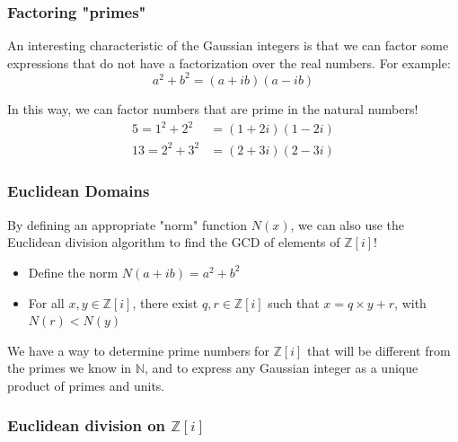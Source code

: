 \documentclass{beamer}
\begin{document}
\begin{frame}
	\frametitle{Factoring "primes"}

	An interesting characteristic of the Gaussian integers is that we can factor some
	expressions that do not have a factorization over the real numbers. For example:
	\[a^2 + b^2 = (a+ib)(a-ib) \]

	In this way, we can factor numbers that are prime in the natural numbers!
	\begin{align*}
		5 = 1^2 + 2^2 &= (1+2i)(1-2i) \\
		13 = 2^2 + 3^2 &= (2+3i)(2-3i)
	\end{align*}
\end{frame}

\begin{frame}
	\frametitle{Euclidean Domains}

	By defining an appropriate "norm" function $N(x)$, we can also use the Euclidean 
	division algorithm to find the GCD of elements of $\mathbb{Z}[i]$!
	\begin{itemize}
		\item Define the norm $N(a+ib) = a^2 + b^2$
		\item For all $x,y \in \mathbb{Z}[i]$, there exist $q,r \in \mathbb{Z}[i]$
			such that $x = q\times y + r$, with $N(r) < N(y)$
	\end{itemize}

	We have a way to determine prime numbers for $\mathbb{Z}[i]$
	that will be different from the primes we know in $\mathbb{N}$, and to express any
	Gaussian integer as a unique product of primes and units.
\end{frame}

\begin{frame}
	\frametitle{Euclidean division on $\mathbb{Z}[i]$}


\end{frame}
\end{document}
